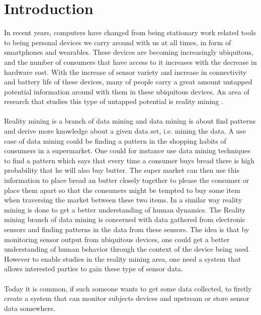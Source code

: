 \chapter{Introduction}
\label{cha:introduction}

In recent years, computers have changed from being stationary work related tools to being personal devices we carry around with us at all times, in form of smartphones and wearables. These devices are becoming increasingly ubiquitous, and the number of consumers that have access to it increases with the decrease in hardware cost. With the increase of sensor variety and increase in connectivity and battery life of these devices, many of people carry a great amount untapped potential information around with them in these ubiquitous devices.  An area of research that studies this type of untapped potential is reality mining \parencite{eagle2006_reality_mining_definition}.
\\\\
Reality mining is a branch of data mining and data mining is about find patterns and derive more knowledge about a given data set, i.e. mining the data. A use case of data mining could be finding a pattern in the shopping habits of consumers in a supermarket. One could for instance use data mining techniques to find a pattern which says that every time a consumer buys bread there is high probability that he will also buy butter.
The super market can then use this information to place bread an butter closely together to please the consumer or place them apart so that the consumers might be tempted to buy some item when traversing the market between these two items. In a similar way reality mining is done to get a better understanding of human dynamics. The Reality mining branch of data mining is concerned with data gathered from electronic sensors and finding patterns in the data from these sensors. The idea is that by monitoring sensor output from ubiquitous devices, one could get a better understanding of human behavior through the context of the device being used. However to enable studies in the reality mining area, one need a system that allows interested parties to gain these type of sensor data. 
\\\\


Today it is common, if such someone wants to get some data collected, to firstly create a system that can monitor subjects devices and upstream or store sensor data somewhere. 

